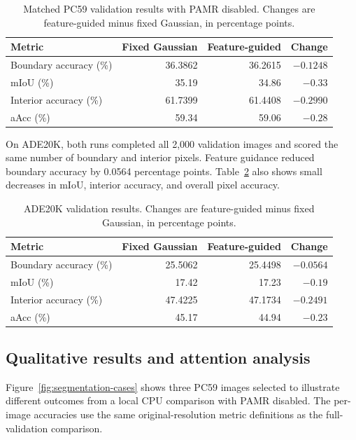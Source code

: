 \begin{table}[htbp]
    \centering
    \caption{Matched PC59 validation results with PAMR disabled. Changes are
    feature-guided minus fixed Gaussian, in percentage points.}
    \label{tab:pc59-results}
    \begin{tabular}{lrrr}
        \hline
        Metric & Fixed Gaussian & Feature-guided & Change \\
        \hline
        Boundary accuracy (\%) & 36.3862 & 36.2615 & $-0.1248$ \\
        mIoU (\%)              & 35.19   & 34.86   & $-0.33$   \\
        Interior accuracy (\%) & 61.7399 & 61.4408 & $-0.2990$ \\
        aAcc (\%)              & 59.34   & 59.06   & $-0.28$   \\
        \hline
    \end{tabular}
\end{table}

On ADE20K, both runs completed all 2,000 validation images and scored the
same number of boundary and interior pixels. Feature guidance reduced boundary
accuracy by 0.0564 percentage points. Table~\ref{tab:ade20k-results} also
shows small decreases in mIoU, interior accuracy, and overall pixel accuracy.

\begin{table}[htbp]
    \centering
    \caption{ADE20K validation results. Changes are feature-guided minus
    fixed Gaussian, in percentage points.}
    \label{tab:ade20k-results}
    \begin{tabular}{lrrr}
        \hline
        Metric & Fixed Gaussian & Feature-guided & Change \\
        \hline
        Boundary accuracy (\%) & 25.5062 & 25.4498 & $-0.0564$ \\
        mIoU (\%)              & 17.42   & 17.23   & $-0.19$   \\
        Interior accuracy (\%) & 47.4225 & 47.1734 & $-0.2491$ \\
        aAcc (\%)              & 45.17   & 44.94   & $-0.23$   \\
        \hline
    \end{tabular}
\end{table}

\subsection{Qualitative results and attention analysis}
Figure~\ref{fig:segmentation-cases} shows three PC59 images selected to
illustrate different outcomes from a local CPU comparison with PAMR disabled.
The per-image accuracies use the same original-resolution metric definitions
as the full-validation comparison.

